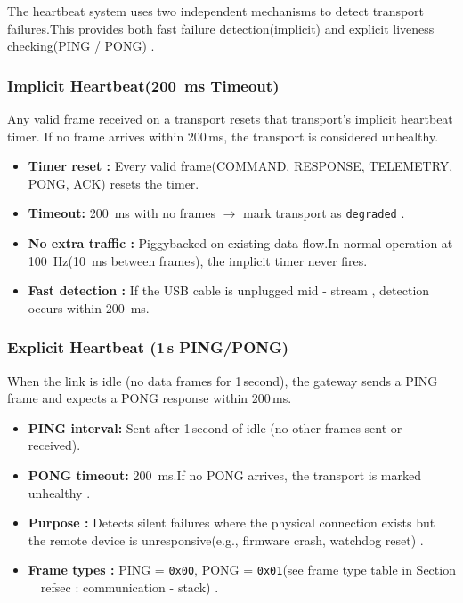     The heartbeat system uses two independent mechanisms to detect transport
        failures.This provides both fast failure
        detection(implicit) and
    explicit liveness checking(PING / PONG)
        .

\subsubsection{Implicit Heartbeat(200\, ms Timeout)}

    Any valid frame received on a transport resets that transport's implicit heartbeat timer. If no frame arrives within 200\,ms, the transport is considered unhealthy.

\begin{itemize}[leftmargin = 1.5em, topsep = 4pt, itemsep = 2pt]
    \item \textbf{Timer reset :} Every valid
    frame(COMMAND, RESPONSE, TELEMETRY, PONG, ACK)
resets the timer.
    \item \textbf{Timeout:
}
200\,
    ms with no frames $\rightarrow$ mark transport as \texttt{degraded}
        .
    \item \textbf{No extra traffic :
       } Piggybacked on existing data flow.In normal operation at 100\,
    Hz(10\, ms between frames), the implicit timer never fires.
    \item \textbf{Fast detection :} If the USB cable is unplugged mid - stream
    ,
    detection occurs within 200\, ms.
\end{itemize}

\subsubsection{Explicit Heartbeat (1\,s PING/PONG)}

When the link is idle (no data frames for 1\,second), the gateway sends a PING frame and expects a PONG response within 200\,ms.

\begin{itemize}[leftmargin=1.5em,topsep=4pt,itemsep=2pt]
    \item \textbf{PING interval:} Sent after 1\,second of idle (no other frames sent or received).
    \item \textbf{PONG timeout:
}
200\, ms.If no PONG arrives,
    the transport is marked unhealthy
        .
    \item \textbf{Purpose :} Detects silent failures where the physical
            connection exists but the remote device is
            unresponsive(e.g., firmware crash, watchdog reset)
        .
    \item \textbf{Frame types :
       } PING = \texttt{0x00},
          PONG = \texttt{0x01}(see frame type table in Section ~\
                               ref{sec : communication - stack})
                     .
\end{itemize}

